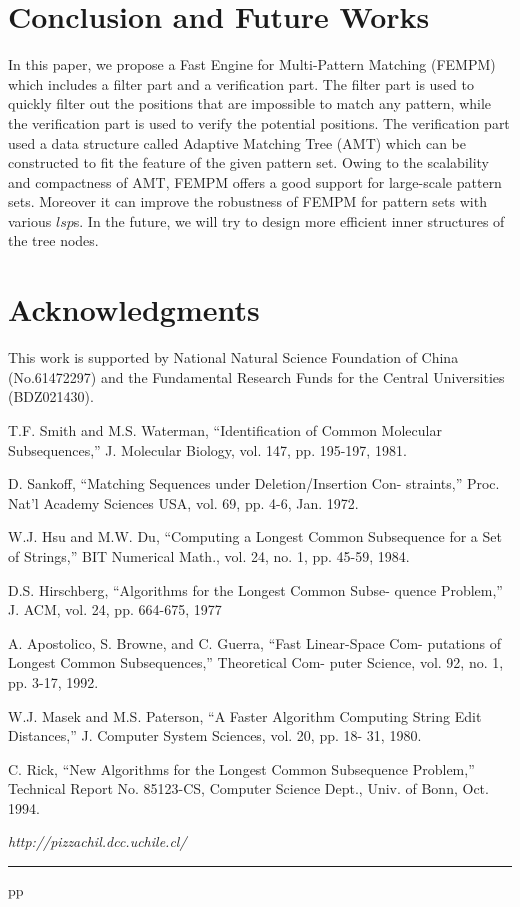 \documentclass{article}
\begin{document}
\section{Conclusion and Future Works}
\label{sec:conclusion}

In this paper, we propose a Fast Engine for Multi-Pattern Matching
(\textsf{FEMPM}) which includes a filter part and a verification
part. The filter part is used to quickly filter out the positions that
are impossible to match any pattern, while the verification part is
used to verify the potential positions. The verification part used a
data structure called Adaptive Matching Tree (AMT) which can be
constructed to fit the feature of the given pattern set. Owing to the
scalability and compactness of AMT, \textsf{FEMPM} offers a good
support for large-scale pattern sets. Moreover it can improve the
robustness of \textsf{FEMPM} for pattern sets with various $lsp$s. In
the future, we will try to design more efficient inner structures of
the tree nodes.

\section{Acknowledgments}

This work is supported by National Natural Science Foundation of China
(No.61472297) and the Fundamental Research Funds for the Central
Universities (BDZ021430).


\begin{thebibliography}{99}

 T.F. Smith and M.S. Waterman, “Identification of
  Common Molecular Subsequences,” J. Molecular Biology, vol. 147,
  pp. 195-197, 1981.

 D. Sankoff, “Matching Sequences under
Deletion/Insertion Con- straints,” Proc. Nat’l Academy Sciences USA,
vol. 69, pp. 4-6, Jan.  1972.

 W.J. Hsu and M.W. Du, “Computing a Longest Common
  Subsequence for a Set of Strings,” BIT Numerical Math., vol. 24,
  no. 1, pp. 45-59, 1984.

 D.S. Hirschberg, “Algorithms for the Longest Common Subse-
quence Problem,” J. ACM, vol. 24, pp. 664-675, 1977

 A. Apostolico, S. Browne, and C. Guerra,
  “Fast Linear-Space Com- putations of Longest Common Subsequences,”
  Theoretical Com- puter Science, vol. 92, no. 1, pp. 3-17, 1992.

 W.J. Masek and M.S. Paterson, “A Faster Algorithm
  Computing String Edit Distances,” J. Computer System Sciences,
  vol. 20, pp. 18- 31, 1980.

 C. Rick, “New Algorithms for the Longest Common
  Subsequence Problem,” Technical Report No. 85123-CS, Computer
  Science Dept., Univ. of Bonn, Oct. 1994.
  


 {\it http://pizzachil.dcc.uchile.cl/}

\end{thebibliography}  


\vspace*{-0.01in}
\noindent
\rule{12.6cm}{.1mm}
pp
\end{document}
